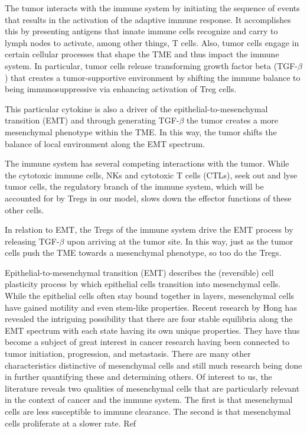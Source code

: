 \documentclass[11pt, a4paper, preprint]{article}
\begin{document}
The tumor interacts with the immune system by initiating the sequence of events that results in the activation of the adaptive immune response.
It accomplishes this by presenting antigens that innate immune cells recognize and carry to lymph nodes to activate, among other things, T cells.
Also, tumor cells engage in certain cellular processes that shape the TME and thus impact the immune system.
In particular, tumor cells release transforming growth factor beta (TGF-$\beta$) that creates a tumor-supportive environment by shifting the immune balance to being immunosuppressive via enhancing activation of Treg cells.

This particular cytokine is also a driver of the epithelial-to-mesenchymal transition (EMT) and through generating TGF-$\beta$ the tumor creates a more mesenchymal phenotype within the TME.
In this way, the tumor shifts the balance of local environment along the EMT spectrum.

The immune system has several competing interactions with the tumor.
While the cytotoxic immune cells, NKs and cytotoxic T cells (CTLs), seek out and lyse tumor cells, the regulatory branch of the immune system, which will be accounted for by Tregs in our model, slows down the effector functions of these other cells. %

In relation to EMT, the Tregs of the immune system drive the EMT process by releasing TGF-$\beta$ upon arriving at the tumor site\cite{terry2017new}.
In this way, just as the tumor cells push the TME towards a mesenchymal phenotype, so too do the Tregs.

Epithelial-to-mesenchymal transition (EMT) describes the (reversible) cell plasticity process by which epithelial cells transition into mesenchymal cells.
While the epithelial cells often stay bound together in layers, mesenchymal cells have gained motility and even stem-like properties\cite{nieto2016emt}.
Recent research by Hong has revealed the intriguing possibility that there are four stable equilibria along the EMT spectrum with each state having its own unique properties\cite{hong2015ovol2}.
They have thus become a subject of great interest in cancer research having been connected to tumor initiation, progression, and metastasis\cite{nieto2016emt}.
There are many other characteristics distinctive of mesenchymal cells and still much research being done in further quantifying these and determining others.
Of interest to us, the literature reveals two qualities of mesenchymal cells that are particularly relevant in the context of cancer and the immune system.
The first is that mesenchymal cells are less susceptible to immune clearance\cite{terry2017new}. 
%
The second is that mesenchymal cells proliferate at a slower rate. Ref
\end{document}
